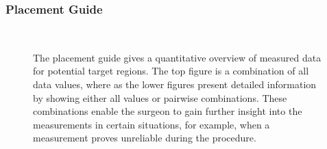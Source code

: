 \documentclass[review]{vgtc}                 %
\begin{document}
\subsubsection{Placement Guide}\label{sec:overview:placement:guide}
\begin{figure}[t]
  \centering
  \\
  \caption{The placement guide gives a quantitative overview of measured data for potential target regions. The top figure is a combination of all data values, where as the lower figures present detailed information by showing either all values or pairwise combinations. These combinations enable the surgeon to gain further insight into the measurements in certain situations, for example, when a measurement proves unreliable during the procedure.}
  \label{fig:placementguide}
\end{figure}
\end{document}
